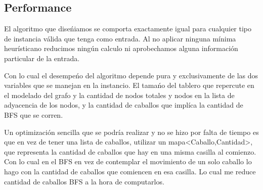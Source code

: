\subsection{Performance}

El algoritmo que dise\'niamos se comporta exactamente igual para cualquier tipo de instancia v\'alida que tenga como entrada. Al no aplicar ninguna m\'inima heur\'isticano reducimos ning\'un calculo ni aprobechamos alguna informaci\'on particular de la entrada.

Con lo cual el desempe\'no del algoritmo depende pura y exclusivamente de las dos variables que se manejan en la instancio. El tama\'no del tablero que repercute en el modelado del grafo y la cantidad de nodos totales y nodos en la lista de adyacencia de los nodos, y la cantidad de caballos que impl\'ica la cantidad de BFS que se corren.

Un optimizaci\'on sencilla que se podr\'ia realizar y no se hizo por falta de tiempo es que en vez de tener una lista de caballos, utilizar un mapa<Caballo,Cantidad>, que representa la cantidad de caballos que hay en una misma casilla al comienzo.
Con lo cual en el BFS en vez de contemplar el movimiento de un solo caballo lo hago con la cantidad de caballos que comiencen en esa casilla. Lo cual me reduce cantidad de caballos BFS a la hora de computarlos.
